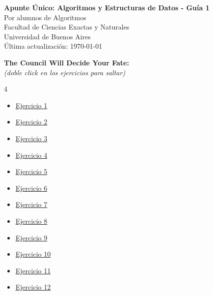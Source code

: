



\begin{center}
    \Huge \textbf{Apunte Único: Algoritmos y Estructuras de Datos - Guía 1} \\
    \vspace{0.5cm}
    \Large Por alumnos de Algoritmos \\
    \normalsize Facultad de Ciencias Exactas y Naturales \\
    Universidad de Buenos Aires \\
    \vspace{0.3cm}
    \small Última actualización: \today
\end{center}
\vspace{1cm}

\hypertarget{indice}{}
\noindent\textbf{\Large The Council Will Decide Your Fate:} \\
\textit{(doble click en los ejercicios para saltar)}

\begin{multicols}{4}
\begin{itemize}
    \item \hyperlink{ej1}{Ejercicio 1}
    \item \hyperlink{ej2}{Ejercicio 2}
    \item \hyperlink{ej3}{Ejercicio 3}
    \item \hyperlink{ej4}{Ejercicio 4}
    \item \hyperlink{ej5}{Ejercicio 5}
    \item \hyperlink{ej6}{Ejercicio 6}
    \item \hyperlink{ej7}{Ejercicio 7}
    \item \hyperlink{ej8}{Ejercicio 8}
    \item \hyperlink{ej9}{Ejercicio 9}
    \item \hyperlink{ej10}{Ejercicio 10}
    \item \hyperlink{ej11}{Ejercicio 11}
    \item \hyperlink{ej12}{Ejercicio 12}
\end{itemize}
\end{multicols}

\vspace{0.5cm}


